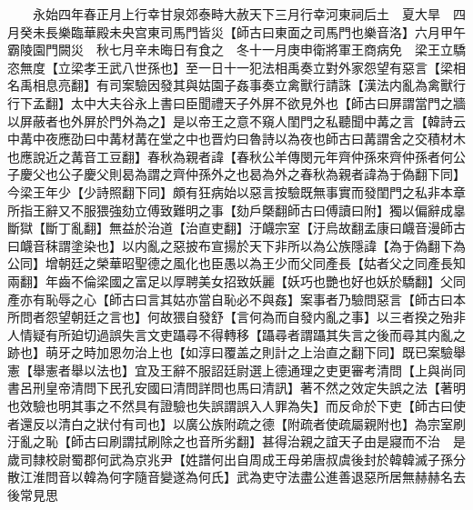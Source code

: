 　　永始四年春正月上行幸甘泉郊泰畤大赦天下三月行幸河東祠后土　夏大旱　四月癸未長樂臨華殿未央宫東司馬門皆災【師古曰東面之司馬門也樂音洛】六月甲午霸陵園門闕災　秋七月辛未晦日有食之　冬十一月庚申衛將軍王商病免　梁王立驕恣無度【立梁孝王武八世孫也】至一日十一犯法相禹奏立對外家怨望有惡言【梁相名禹相息亮翻】有司案驗因發其與姑園子姦事奏立禽獸行請誅【漢法内亂為禽獸行行下孟翻】太中大夫谷永上書曰臣聞禮天子外屏不欲見外也【師古曰屏謂當門之牆以屏蔽者也外屏於門外為之】是以帝王之意不窺人閨門之私聽聞中冓之言【韓詩云中冓中夜應劭曰中冓材冓在堂之中也晋灼曰魯詩以為夜也師古曰冓謂舍之交積材木也應說近之冓音工豆翻】春秋為親者諱【春秋公羊傳閔元年齊仲孫來齊仲孫者何公子慶父也公子慶父則曷為謂之齊仲孫外之也曷為外之春秋為親者諱為于偽翻下同】今梁王年少【少詩照翻下同】頗有狂病始以惡言按驗既無事實而發閨門之私非本章所指王辭又不服猥強劾立傅致難明之事【劾戶槩翻師古曰傅讀曰附】獨以偏辭成辠斷獄【斷丁亂翻】無益於治道【治直吏翻】汙衊宗室【汙烏故翻孟康曰衊音漫師古曰衊音秣謂塗染也】以内亂之惡披布宣揚於天下非所以為公族隱諱【為于偽翻下為公同】增朝廷之榮華昭聖德之風化也臣愚以為王少而父同產長【姑者父之同產長知兩翻】年齒不倫梁國之富足以厚聘美女招致妖麗【妖巧也艷也好也妖於驕翻】父同產亦有恥辱之心【師古曰言其姑亦當自恥必不與姦】案事者乃驗問惡言【師古曰本所問者怨望朝廷之言也】何故猥自發舒【言何為而自發内亂之事】以三者揆之殆非人情疑有所廹切過誤失言文吏躡尋不得轉移【躡尋者謂躡其失言之後而尋其内亂之跡也】萌牙之時加恩勿治上也【如淳曰覆盖之則計之上治直之翻下同】既已案驗舉憲【舉憲者舉以法也】宜及王辭不服詔廷尉選上德通理之吏更審考清問【上與尚同書呂刑皇帝清問下民孔安國曰清問詳問也馬曰清訊】著不然之效定失誤之法【著明也效驗也明其事之不然具有證驗也失誤謂誤入人罪為失】而反命於下吏【師古曰使者還反以清白之狀付有司也】以廣公族附疏之德【附疏者使疏屬親附也】為宗室刷汙亂之恥【師古曰刷謂拭刷除之也音所劣翻】甚得治親之誼天子由是寢而不治　是歲司隸校尉蜀郡何武為京兆尹【姓譜何出自周成王母弟唐叔虞後封於韓韓滅子孫分散江淮問音以韓為何字隨音變遂為何氏】武為吏守法盡公進善退惡所居無赫赫名去後常見思


